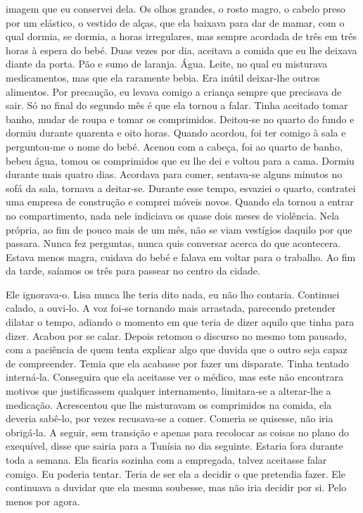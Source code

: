 imagem que eu conservei dela. Os olhos grandes, o rosto magro, o cabelo
preso por um elástico, o vestido de alças, que ela baixava para dar de
mamar, com o qual dormia, se dormia, a horas irregulares, mas sempre
acordada de três em três horas à espera do bebé. Duas vezes por dia,
aceitava a comida que eu lhe deixava diante da porta. Pão e sumo de
laranja. Água. Leite, no qual eu misturava medicamentos, mas que ela
raramente bebia. Era inútil deixar­‑lhe outros alimentos. Por precaução,
eu levava comigo a criança sempre que precisava de sair. Só no final do
segundo mês é que ela tornou a falar. Tinha aceitado tomar banho, mudar
de roupa e tomar os comprimidos. Deitou­‑se no quarto do fundo e dormiu
durante quarenta e oito horas. Quando acordou, foi ter comigo à sala e
perguntou­‑me o nome do bebé. Acenou com a cabeça, foi ao quarto de
banho, bebeu água, tomou os comprimidos que eu lhe dei e voltou para a
cama. Dormiu durante mais quatro dias. Acordava para comer, sentava­‑se
alguns minutos no sofá da sala, tornava a deitar­‑se. Durante esse
tempo, esvaziei o quarto, contratei uma empresa de construção e comprei
móveis novos. Quando ela tornou a entrar no compartimento, nada nele
indiciava os quase dois meses de violência. Nela própria, ao fim de
pouco mais de um mês, não se viam vestígios daquilo por que passara.
Nunca fez perguntas, nunca quis conversar acerca do que acontecera.
Estava menos magra, cuidava do bebé e falava em voltar para o trabalho.
Ao fim da tarde, saíamos os três para passear no centro da cidade.

Ele ignorava­‑o. Lisa nunca lhe teria dito nada, eu não lho contaria.
Continuei calado, a ouvi­‑lo. A voz foi­‑se tornando mais arrastada,
parecendo pretender dilatar o tempo, adiando o momento em que teria de
dizer aquilo que tinha para dizer. Acabou por se calar. Depois retomou o
discurso no mesmo tom pausado, com a paciência de quem tenta explicar
algo que duvida que o outro seja capaz de compreender. Temia que ela
acabasse por fazer um disparate. Tinha tentado interná­‑la. Conseguira
que ela aceitasse ver o médico, mas este não encontrara motivos que
justificassem qualquer internamento, limitara­‑se a alterar­‑lhe a
medicação. Acrescentou que lhe misturavam os comprimidos na comida, ela
deveria sabê­‑lo, por vezes recusava­‑se a comer. Comeria se quisesse,
não iria obrigá­‑la. A seguir, sem transição e apenas para recolocar as
coisas no plano do exequível, disse que sairia para a Tunísia no dia
seguinte. Estaria fora durante toda a semana. Ela ficaria sozinha com a
empregada, talvez aceitasse falar comigo. Eu poderia tentar. Teria de
ser ela a decidir o que pretendia fazer. Ele continuava a duvidar que
ela mesma soubesse, mas não iria decidir por si. Pelo menos por agora.

